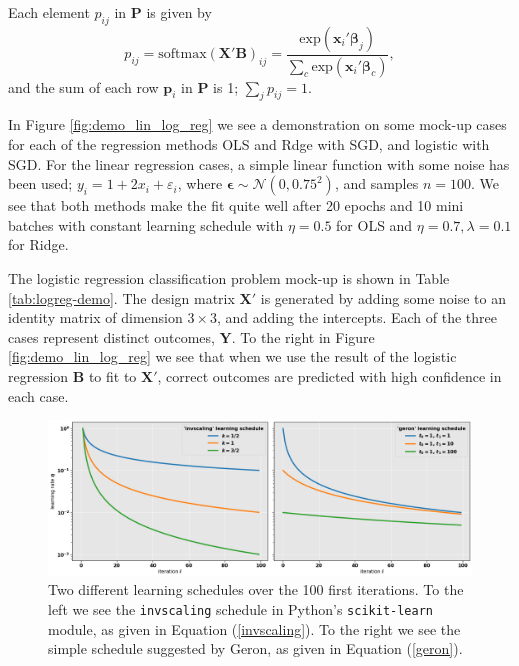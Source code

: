 \documentclass[]{article}
\begin{document}
Each element $p_{ij}$ in $\mathbf{P}$ is given by
\begin{equation} \label{log-reg-pij}
	p_{ij} = \mathrm{softmax}(\mathbf{X}'\mathbf{B})_{ij} = \frac{\mathrm{exp}(\mathbf{x}_i'\mathbf{\beta}_j)} {\sum_{c}\mathrm{exp}(\mathbf{x}_i'\mathbf{\beta}_c)},
\end{equation}
and the sum of each row $\mathbf{p}_i$ in $\mathbf{P}$ is 1; $\sum_{j} p_{ij} = 1$.

\vspace{5mm}

In Figure \ref{fig:demo_lin_log_reg} we see a demonstration on some mock-up cases for each of the regression methods OLS and Rdge with SGD, and logistic with SGD. For the linear regression cases, a simple linear function with some noise has been used; $y_i = 1 + 2x_i + \varepsilon_i$, where $\mathbf{\epsilon} \sim \mathcal{N}(0, 0.75^2)$, and samples $n=100$. We see that both methods make the fit quite well after 20 epochs and 10 mini batches with constant learning schedule with $\eta = 0.5$ for OLS and $\eta = 0.7, \lambda=0.1$ for Ridge.

The logistic regression classification problem mock-up is shown in Table \ref{tab:logreg-demo}. The design matrix $\mathbf{X}'$ is generated by adding some noise to an identity matrix of dimension $3 \times 3$, and adding the intercepts. Each of the three cases represent distinct outcomes, $\mathbf{Y}$. To the right in Figure \ref{fig:demo_lin_log_reg} we see that when we use the result of the logistic regression $\mathbf{B}$ to fit to $\mathbf{X}'$, correct outcomes are predicted with high confidence in each case.

\begin{figure}[!htb]
	\centering
	\includegraphics[width=1\linewidth]{learning_schedules.png}
	\caption{Two different learning schedules over the 100 first iterations. To the left we see the \lstinline|invscaling| schedule in Python's \lstinline|scikit-learn| module, as given in Equation (\ref{invscaling}). To the right we see the simple schedule suggested by Geron, as given in Equation (\ref{geron}).}
	\label{fig:learning_schedules}
\end{figure}
\end{document}
